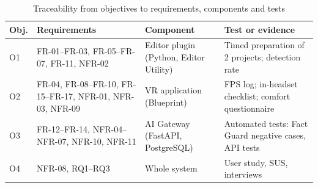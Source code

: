 \begin{table}[H]
\centering
\begin{tightblock}
\footnotesize
\begin{tabularx}{\textwidth}{P{0.9cm} P{4.0cm} P{3.4cm} L}
\toprule
\textbf{Obj.} & \textbf{Requirements} & \textbf{Component} & \textbf{Test or evidence} \\
\midrule
O1 & FR-01--FR-03, FR-05--FR-07, FR-11, NFR-02 & Editor plugin (Python, Editor Utility) & Timed preparation of 2 projects; detection rate \\
O2 & FR-04, FR-08--FR-10, FR-15--FR-17, NFR-01, NFR-03, NFR-09 & VR application (Blueprint) & FPS log; in-headset checklist; comfort questionnaire \\
O3 & FR-12--FR-14, NFR-04--NFR-07, NFR-10, NFR-11 & AI Gateway (FastAPI, PostgreSQL) & Automated tests: Fact Guard negative cases, API tests \\
O4 & NFR-08, RQ1--RQ3 & Whole system & User study, SUS, interviews \\
\bottomrule
\end{tabularx}
\end{tightblock}
\caption{Traceability from objectives to requirements, components and tests}
\label{tab:trace}
\end{table}
